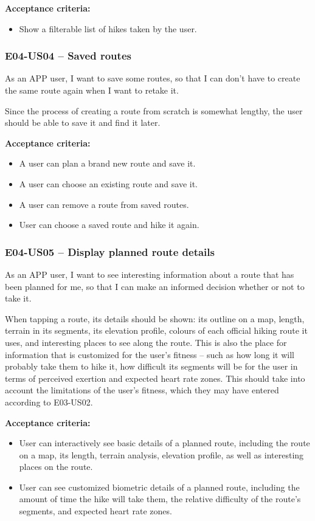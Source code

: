 \textbf{Acceptance criteria:}
\begin{itemize}
    \item Show a filterable list of hikes taken by the user.
\end{itemize}

\subsubsection*{E04-US04 -- Saved routes}
As an APP user, I want to save some routes, so that I can don't have to create the same route again when I want to retake it.

Since the process of creating a route from scratch is somewhat lengthy, the user should be able to save it and find it later.

\textbf{Acceptance criteria:}
\begin{itemize}
    \item A user can plan a brand new route and save it.
    \item A user can choose an existing route and save it.
    \item A user can remove a route from saved routes.
    \item User can choose a saved route and hike it again.
\end{itemize}

\subsubsection*{E04-US05 -- Display planned route details}
As an APP user, I want to see interesting information about a route that has been planned for me, so that I can make an informed decision whether or not to take it.

When tapping a route, its details should be shown: its outline on a map, length, terrain in its segments, its elevation profile, colours of each official hiking route it uses, and interesting places to see along the route.
This is also the place for information that is customized for the user's fitness -- such as how long it will probably take them to hike it, how difficult its segments will be for the user in terms of perceived exertion and expected heart rate zones.
This should take into account the limitations of the user's fitness, which they may have entered according to E03-US02.

\textbf{Acceptance criteria:}
\begin{itemize}
    \item User can interactively see basic details of a planned route, including the route on a map, its length, terrain analysis, elevation profile, as well as interesting places on the route.
    \item User can see customized biometric details of a planned route, including the amount of time the hike will take them, the relative difficulty of the route's segments, and expected heart rate zones.
\end{itemize}

